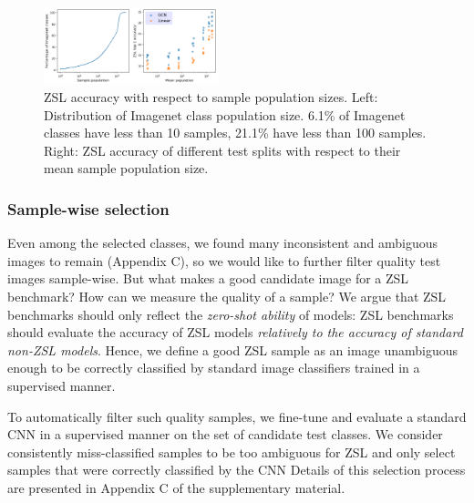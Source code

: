 \begin{figure}[h]
\centering
\includegraphics[width=0.45\textwidth]{Figure_5.png}
\caption{
ZSL accuracy with respect to sample population sizes. 
Left: Distribution of Imagenet class population size. 
6.1\% of Imagenet classes have less than 10 samples, 21.1\% have less than 100 samples.
Right: ZSL accuracy of different test splits with respect to their mean sample population size.
}
\end{figure}

\subsubsection{Sample-wise selection} 

Even among the selected classes, we found many inconsistent and ambiguous images to remain (Appendix C), 
so we would like to further filter quality test images sample-wise. %
But what makes a good candidate image for a ZSL benchmark? How can we measure the quality of a sample?
We argue that ZSL benchmarks should only reflect the \textit{zero-shot ability} of models:
ZSL benchmarks should evaluate the accuracy of ZSL models \textit{relatively to the accuracy of standard non-ZSL models}. %
Hence, we define a good ZSL sample as an image unambiguous enough to be correctly classified by standard image classifiers trained in a supervised manner. 

To automatically filter such quality samples, 
we fine-tune and evaluate a standard CNN in a supervised manner on the set of candidate test classes.
We consider consistently miss-classified samples to be too ambiguous for ZSL 
and only select samples that were correctly classified by the CNN
Details of this selection process are presented in Appendix C of the supplementary material. %


